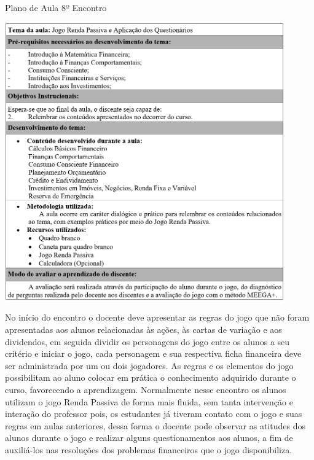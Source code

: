 \graphicspath{{quadros/}} 
\begin{quadro}[!ht]
\centering
\begin{minipage}{0.8\textwidth}
\caption{Plano de Aula 8º Encontro}
\centering
\includegraphics[width=0.9\textwidth]{quadro-14-aula 8}
\label{quad: quadro-14-aula 8}
\end{minipage}
\end{quadro}

No início do encontro o docente deve apresentar as regras do jogo que não foram apresentadas aos alunos relacionadas às ações, às cartas de variação e aos dividendos, em seguida dividir os personagens do jogo entre os alunos a seu critério e iniciar o jogo, cada personagem e sua respectiva ficha financeira deve ser administrada por um ou dois jogadores. As regras e os elementos do jogo possibilitam ao aluno colocar em prática o conhecimento adquirido durante o curso, favorecendo a aprendizagem. Normalmente nesse encontro os alunos utilizam o jogo Renda Passiva de forma mais fluida, sem tanta intervenção e interação do professor pois, os estudantes já tiveram contato com o jogo e suas regras em aulas anteriores, dessa forma o docente pode observar as atitudes dos alunos durante o jogo e realizar alguns questionamentos aos alunos, a fim de auxiliá-los nas resoluções dos problemas financeiros que o jogo disponibiliza.

